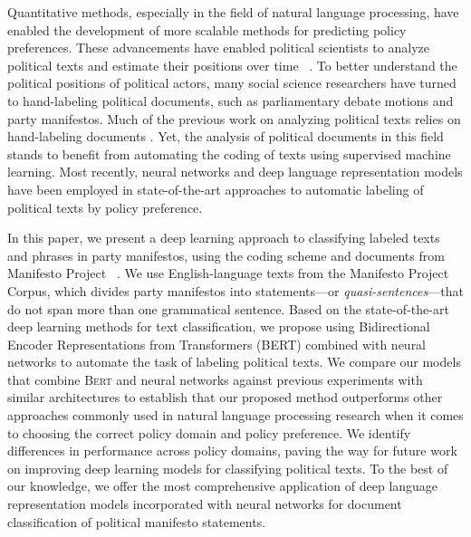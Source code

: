 \documentclass[11pt]{article}
\begin{document}
Quantitative methods, especially in the field of natural language processing, have enabled the development of more scalable methods for predicting policy preferences. These advancements have enabled political scientists to analyze political texts and estimate their positions over time ~\cite{nanni2016topfish,zirn2016classifying}. To better understand the political positions of political actors, many social science researchers have turned to hand-labeling political documents, such as parliamentary debate motions and party manifestos. Much of the previous work on analyzing political texts relies on hand-labeling documents \cite{abercrombie2018sentiment,gilardi2009learning,krause2011policy,simmons2004globalization}. Yet, the analysis of political documents in this field stands to benefit from automating the coding of texts using supervised machine learning. Most recently, neural networks and deep language representation models have been employed in state-of-the-art approaches to automatic labeling of political texts by policy preference.

In this paper, we present a deep learning approach to classifying labeled texts and phrases in party manifestos, using the coding scheme and documents from Manifesto Project ~\cite{volkens2019manifesto}.
We use English-language texts from the Manifesto Project Corpus, which divides party manifestos into statements---or \emph{quasi-sentences}---that do not span more than one grammatical sentence. Based on the state-of-the-art deep learning methods for text classification, we propose using Bidirectional Encoder Representations from Transformers (BERT) combined with neural networks to automate the task of labeling political texts. We compare our models that combine \textsc{Bert} and neural networks against previous experiments with similar architectures to establish that our proposed method outperforms other approaches commonly used in natural language processing research when it comes to choosing the correct policy domain and policy preference. We identify differences in performance across policy domains, paving the way for future work on improving deep learning models for classifying political texts. To the best of our knowledge, we offer the most comprehensive application of deep language representation models incorporated with neural networks for document classification of political manifesto statements.
\end{document}
